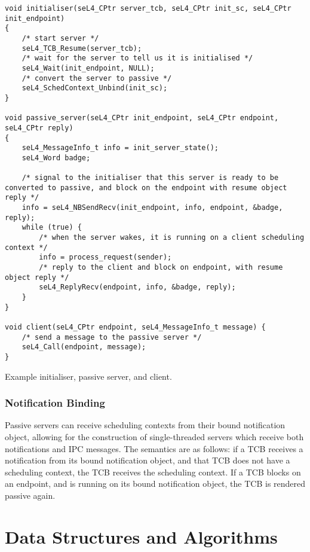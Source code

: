 \begin{listing}[t]
\begin{verbatim}
void initialiser(seL4_CPtr server_tcb, seL4_CPtr init_sc, seL4_CPtr init_endpoint) 
{
    /* start server */
    seL4_TCB_Resume(server_tcb);
    /* wait for the server to tell us it is initialised */
    seL4_Wait(init_endpoint, NULL);
    /* convert the server to passive */
    seL4_SchedContext_Unbind(init_sc);
}

void passive_server(seL4_CPtr init_endpoint, seL4_CPtr endpoint, seL4_CPtr reply) 
{    
    seL4_MessageInfo_t info = init_server_state();
    seL4_Word badge;

    /* signal to the initialiser that this server is ready to be converted to passive, and block on the endpoint with resume object reply */
    info = seL4_NBSendRecv(init_endpoint, info, endpoint, &badge, reply);
    while (true) {
        /* when the server wakes, it is running on a client scheduling context */
        info = process_request(sender);
        /* reply to the client and block on endpoint, with resume object reply */
        seL4_ReplyRecv(endpoint, info, &badge, reply);
    }
}

void client(seL4_CPtr endpoint, seL4_MessageInfo_t message) {
    /* send a message to the passive server */
    seL4_Call(endpoint, message);
}
\end{verbatim}
\caption{Example initialiser, passive server, and client.}
\label{list:passive-server}
\end{listing}

\subsubsection{Notification Binding}

Passive servers can receive scheduling contexts from their bound notification object, allowing for
the construction of single-threaded servers which receive both notifications and IPC messages. 
The semantics are as follows: if a TCB receives a notification from its bound notification
object, and that TCB does not have a scheduling context, the TCB receives the scheduling context.
If a TCB blocks on an endpoint, and is running on its bound notification object, the TCB is
rendered passive again. 

\section{Data Structures and Algorithms}

